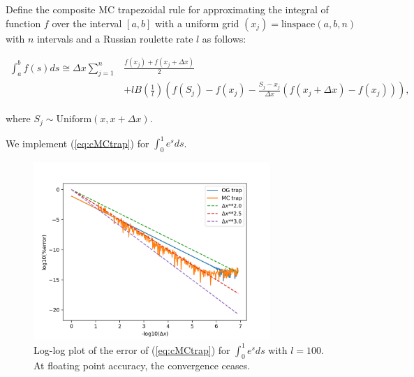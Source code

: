 \documentclass[a4paper,12pt]{article}
\begin{document}
\begin{definition} \label{MCtrap}
    Define the composite MC trapezoidal rule for approximating the integral
    of function $f$ over the interval $[a, b]$ with a uniform grid
    $(x_{j}) = \text{linspace}(a,b,n)$ with $n$
    intervals and a Russian roulette rate $l$ as follows:

    \begin{align} \label{eq:cMCtrap}
        \int_{a}^{b} f(s) ds \cong \Delta x \sum_{j=1}^{n} & \frac{f(x_{j}) + f(x_{j}+\Delta x)}{2} \nonumber \\
                                                           & + l B\left(\frac{1}{l}\right)
        \left(f(S_j) - f(x_{j}) - \frac{S_j - x_{j}}{\Delta x}(f(x_{j}+\Delta x) - f(x_{j}))\right),
    \end{align}

    where $S_j \sim \text{Uniform}(x,x+\Delta x)$.

\end{definition}

\begin{pythonn}
    We implement (\ref{eq:cMCtrap}) for $\int_{0}^{1}e^{s}ds$.
    \vspace*{0.5cm}

    \begin{figure}[h!]
        \centering
        \includegraphics[width=0.8\textwidth]{plots/MCtrap.png}
        \caption{Log-log plot of the error of (\ref{eq:cMCtrap}) for
        $\int_{0}^{1}e^{s}ds$ with $l=100$. At floating point accuracy,
        the convergence ceases.
        }
        \label{fig:MCtrap}
    \end{figure}
\end{pythonn}
\end{document}
